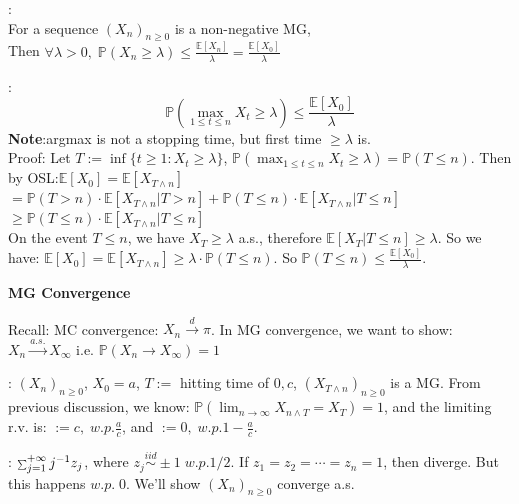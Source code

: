 \documentclass[a4paper, landscape]{article}
\newcommand{\topic}[1]{\par\medskip\textbf{#1}\par}
\newcommand{\subtopic}[1]{\par\textbf{#1}}
\newcommand{\smallsum}{\mathop{\scalebox{0.65}{$\sum$}}\nolimits}
\renewcommand{\topic}[1]{\par\medskip\noindent\colorbox{highlightcolor}{\parbox{\dimexpr\columnwidth-2\fboxsep\relax}{\textbf{#1}}}\par}
\renewcommand{\subtopic}[1]{\par\textbf{\color{blue}{#1}}} %
\begin{document}
\begin{multicols}{4}
\subtopic{Markov inequality in MG}: \\
For a sequence $(X_n)_{n\geqslant0}$ is a non-negative MG, \\
Then $\forall \lambda>0, \;\mathbb P(X_n\geqslant\lambda)\leqslant\frac{\mathbb E[X_n]}{\lambda}=\frac{\mathbb E[X_0]}{\lambda}$ 
\subtopic{Doob's Maximum Inequality}:
\[
\mathbb P(\max_{1\leqslant t \leqslant n}X_t\geqslant \lambda)\leqslant\frac{\mathbb E[X_0]}{\lambda}
\]
\textbf{Note}:argmax is not a stopping time, but first time $\geqslant\lambda$ is.\\
Proof: Let $T:=\inf\{t\geqslant1:X_t\geqslant\lambda\}$, $\mathbb P(\max_{1\leqslant t \leqslant n}X_t\geqslant \lambda)=\mathbb P(T\leqslant n)$. Then by OSL:$\mathbb E[X_0]=\mathbb E[X_{T\land n}]$\\
$=\mathbb P(T>n)\cdot\mathbb E[X_{T\land n}|T>n]+\mathbb P(T\leqslant n)\cdot\mathbb E[X_{T\land n}|T\leqslant n]$\\
$\geqslant \mathbb P(T\leqslant n)\cdot\mathbb E[X_{T\land n}|T\leqslant n]$\\
On the event $T\leqslant n$, we have $X_T\geqslant \lambda$ a.s., therefore $\mathbb E[X_T|T \leqslant n]\geqslant\lambda$. So we have: $\mathbb E[X_0]=\mathbb E[X_{T\land n}]\geqslant\lambda\cdot \mathbb P(T\leqslant n)$. So $\mathbb P(T\leqslant n)\leqslant\frac{\mathbb E[X_0]}{\lambda}$.

\topic{MG Convergence}
Recall: MC convergence: $X_n \overset{d}\to \pi$. In MG convergence, we want to show: $X_n \overset{a.s.}\to X_\infty$ i.e. $\mathbb P(X_n \to X_\infty)=1$
\subtopic{Example: Gambler's Ruin}: $(X_n)_{n\geqslant0}$, $X_0=a$, $T:=$ hitting time of {$0,c$}, $(X_{T\land n})_{n\geqslant0}$
 is a MG. From previous discussion, we know: $\mathbb P(\lim_{n\to \infty}X_{n\land T}=X_T)=1$, and the limiting r.v. is: $:=c,\;w.p.\frac ac$, and $:=0,\;w.p.1-\frac ac$.
 \subtopic{Example}: $\smallsum_{j=1}^{+\infty}j^{-1}z_j$, where $z_j\overset{iid}{\sim}\pm1\;w.p.1/2$. If $z_1=z_2=\cdots=z_n=1$, then diverge. But this happens $w.p.\;0$. We'll show $(X_n)_{n\geqslant0}$ converge a.s.


\end{multicols}
\end{document}
